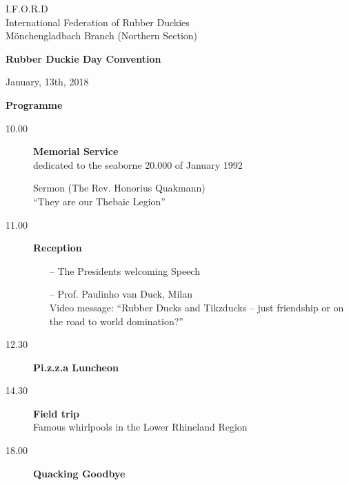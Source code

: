 \documentclass[11pt,paper=a5,parskip=half-]{scrartcl}
\begin{document}
\sffamily \pagestyle{empty}
\centering
\large
I.F.O.R.D\\
International Federation of Rubber Duckies\\
Mönchengladbach Branch (Northern Section)

\medskip
\huge
\textbf{Rubber Duckie Day Convention }

\medskip
\normalsize
January, 13th, 2018

{\huge\bfseries Programme \par }

\begin{description}
\item[10.00] \textbf{Memorial Service}\\
dedicated to the seaborne 20.000 of January 1992

Sermon (The Rev. Honorius Quakmann)\\ \enquote{They are our Thebaic Legion}

\item[11.00] \textbf{Reception}
  \begin{itemize}[leftmargin=0pt]
  \item[--] The Presidents welcoming Speech

\item[--]    Prof. Paulinho van Duck, Milan\\
         Video message:
\enquote{Rubber Ducks and Tikzducks -- just friendship or on the road to world domination?}
\end{itemize}

\item[12.30] \textbf{Pi.z.z.a Luncheon}
\item[14.30] \textbf{Field trip}\\
Famous whirlpools in the Lower Rhineland Region

\item[18.00] \textbf{Quacking Goodbye}

\end{description}
\end{document}
